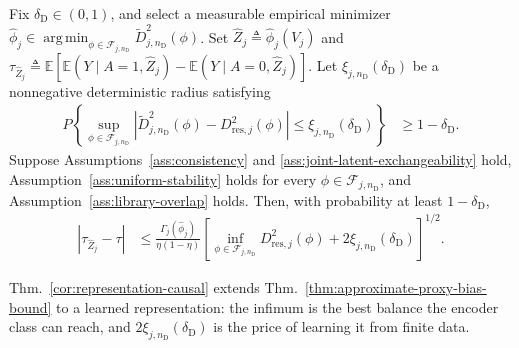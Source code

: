 \begin{theorem}
\label{cor:representation-causal}
	Fix $\delta_{\mathrm D}\in(0,1)$, and select a measurable empirical minimizer $\widehat\phi_j \in \operatorname*{arg\,min}_{\phi\in\mathcal F_{j,n_{\mathrm D}}} \widetilde D_{j,n_{\mathrm D}}^2(\phi)$. Set $\widehat Z_j\triangleq\widehat\phi_j(V_j)$ and $\tau_{\widehat Z_j}\triangleq \mathbb E[ \mathbb E(Y\mid A=1,\widehat Z_j) - \mathbb E(Y\mid A=0,\widehat Z_j)]$. Let $\xi_{j,n_{\mathrm D}}(\delta_{\mathrm D})$ be a nonnegative deterministic radius satisfying
	\begin{align}\label{eq:uniform-discrepancy-radius}
		P\left\{
		\sup_{\phi\in\mathcal F_{j,n_{\mathrm D}}}
		\left|
		\widetilde D_{j,n_{\mathrm D}}^2(\phi)
		-
		D_{\mathrm{res},j}^2(\phi)
		\right|
		\le
		\xi_{j,n_{\mathrm D}}(\delta_{\mathrm D})
		\right\}
		&\ge
		1-\delta_{\mathrm D}.
	\end{align}
	Suppose Assumptions~\ref{ass:consistency} and \ref{ass:joint-latent-exchangeability} hold, Assumption~\ref{ass:uniform-stability} holds for every $\phi\in\mathcal F_{j,n_{\mathrm D}}$, and Assumption~\ref{ass:library-overlap} holds. Then, with probability at least $1-\delta_{\mathrm D}$,
	\begin{align}\label{eq:representation-oracle-causal}
		|\tau_{\widehat Z_j}-\tau| &\le
		\frac{\Gamma_j(\widehat\phi_j)}{\eta(1-\eta)}
		\left[
		\inf_{\phi\in\mathcal F_{j,n_{\mathrm D}}}
		D_{\mathrm{res},j}^2(\phi)
		+
		2\xi_{j,n_{\mathrm D}}(\delta_{\mathrm D})
		\right]^{1/2}.
	\end{align}
\end{theorem}
Thm.~\ref{cor:representation-causal} extends Thm.~\ref{thm:approximate-proxy-bias-bound} to a learned representation: the infimum is the best balance the encoder class can reach, and $2\xi_{j,n_{\mathrm D}}(\delta_{\mathrm D})$ is the price of learning it from finite data.

